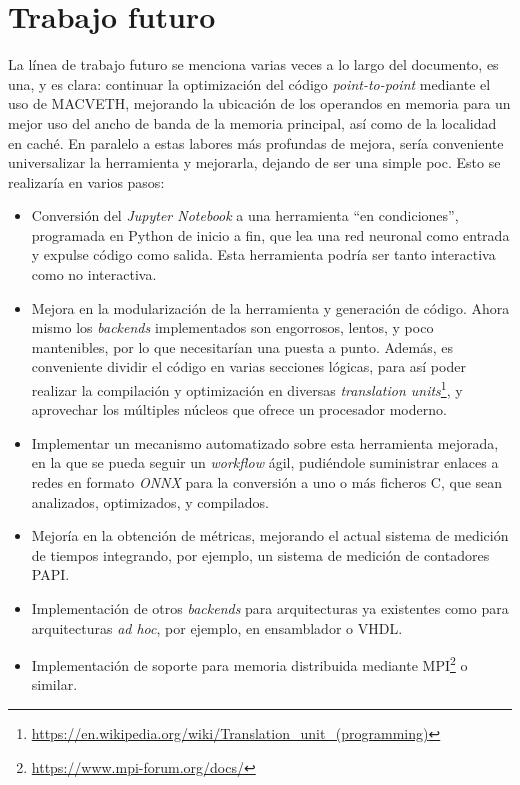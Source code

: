 \section{Trabajo futuro}
La línea de trabajo futuro se menciona varias veces a lo largo del documento, es una, y es clara: continuar la optimización del código \textit{point-to-point} mediante el uso de MACVETH, mejorando la ubicación de los operandos en memoria para un mejor uso del ancho de banda de la memoria principal, así como de la localidad en caché. En paralelo a estas labores más profundas de mejora, sería conveniente universalizar la herramienta y mejorarla, dejando de ser una simple \acrshort{poc}. Esto se realizaría en varios pasos: 
\begin{itemize}
    \item Conversión del \textit{Jupyter Notebook} a una herramienta ``en condiciones'', programada en Python de inicio a fin, que lea una red neuronal como entrada y expulse código como salida. Esta herramienta podría ser tanto interactiva como no interactiva.
    \item Mejora en la modularización de la herramienta y generación de código. Ahora mismo los \textit{backends} implementados son engorrosos, lentos, y poco mantenibles, por lo que necesitarían una puesta a punto. Además, es conveniente dividir el código en varias secciones lógicas, para así poder realizar la compilación y optimización en diversas \textit{translation units}\footnote{\url{https://en.wikipedia.org/wiki/Translation_unit_(programming)}}, y aprovechar los múltiples núcleos que ofrece un procesador moderno.
    \item Implementar un mecanismo automatizado sobre esta herramienta mejorada, en la que se pueda seguir un \textit{workflow} ágil, pudiéndole suministrar enlaces a redes en formato \textit{ONNX} para la conversión a uno o más ficheros C, que sean analizados, optimizados, y compilados.
    \item Mejoría en la obtención de métricas, mejorando el actual sistema de medición de tiempos integrando, por ejemplo, un sistema de medición de contadores PAPI.
    \item Implementación de otros \textit{backends} para arquitecturas ya existentes como para arquitecturas \textit{ad hoc}, por ejemplo, en ensamblador o VHDL.
    \item Implementación de soporte para memoria distribuida mediante MPI\footnote{\url{https://www.mpi-forum.org/docs/}} o similar.
\end{itemize}
